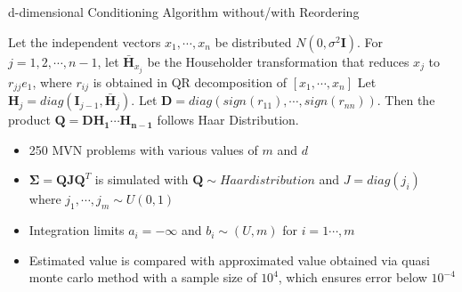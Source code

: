 \begin{frame}{d-dimensional Conditioning Algorithm without/with Reordering}
\footnotesize
	
\begin{theorem}\label{thm:haar}\citet{stewart1980efficient}
	Let the independent vectors $x_1,\cdots,x_{n}$ be distributed $N(0,\sigma^2 \mathbf{I})$. For $j=1,2,\cdots,n-1$, let $\mathbf{\bar{H}}_{x_j}$ be the Householder transformation that reduces $x_j$ to $r_{jj}e_1$, where $r_{ij}$ is obtained in QR decomposition of $[x_1,\cdots,x_n]$ Let $\mathbf{H}_j=diag(\mathbf{I}_{j-1},\bar{\mathbf{H}}_j)$. Let $\mathbf{D}=diag(sign(r_{11}), \cdots, sign(r_{nn}))$. Then the product $\mathbf{Q}=\mathbf{DH_1\cdots H_{n-1}}$ follows Haar Distribution.
\end{theorem}

\begin{itemize}
	\item 250 MVN problems with various values of $m$ and $d$
	\item $\boldsymbol{\Sigma}=\mathbf{Q}\mathbf{J}\mathbf{Q}^T$ is simulated with $\mathbf{Q}\sim{Haar distribution}$ and $J=diag(j_i)$ where $j_1,\cdots,j_m\sim U(0,1)$
	\item Integration limits $a_i=-\infty$ and $b_i\sim(U,m)$ for $i=1\cdots,m$
	\item Estimated value is compared with approximated value obtained via quasi monte carlo method with a sample size of $10^4$, which ensures error below $10^{-4}$
\end{itemize}


\end{frame}
	
